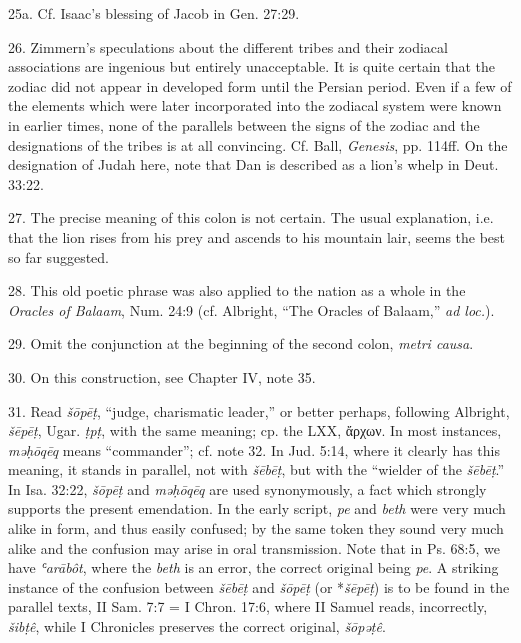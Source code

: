 \begin{enumerate}


25a. Cf. Isaac's blessing of Jacob in Gen. 27:29.

26. Zimmern's speculations about the different tribes and their zodiacal
associations are ingenious but entirely unacceptable. It is quite certain that
the zodiac did not appear in developed form until the Persian period. Even if
a few of the elements which were later incorporated into the zodiacal system
were known in earlier times, none of the parallels between the signs of the
zodiac and the designations of the tribes is at all convincing. Cf. Ball,
\emph{Genesis}, pp. 114ff. On the designation of Judah here, note that Dan is
described as a lion's whelp in Deut. 33:22.

27. The precise meaning of this colon is not certain. The usual explanation,
i.e. that the lion rises from his prey and ascends to his mountain lair, seems
the best so far suggested.

28. This old poetic phrase was also applied to the nation as a whole in the
\emph{Oracles of Balaam}, Num. 24:9 (cf. Albright, ``The Oracles of Balaam,''
\emph{ad loc.}).

29. Omit the conjunction at the beginning of the second colon, \emph{metri
causa}.

30. On this construction, see Chapter IV, note 35.

31. Read \emph{šōpēṭ}, ``judge, charismatic leader,'' or better perhaps,
following Albright, \emph{šēpēṭ}, Ugar. \emph{ṭpṭ}, with the same meaning; cp.
the LXX, ἄρχων. In most instances, \emph{məḥōqēq} means ``commander''; cf.
note 32. In Jud. 5:14, where it clearly has this meaning, it stands in parallel,
not with \emph{šēbēṭ}, but with the ``wielder of the \emph{šēbēṭ}.'' In
Isa. 32:22, \emph{šōpēṭ} and \emph{məḥōqēq} are used synonymously, a fact which
strongly supports the present emendation. In the early script, \emph{pe} and
\emph{beth} were very much alike in form, and thus easily confused; by the same
token they sound very much alike and the confusion may arise in oral
transmission. Note that in Ps. 68:5, we have \emph{ʿarābôt}, where the
\emph{beth} is an error, the correct original being \emph{pe}. A striking
instance of the confusion between \emph{šēbēṭ} and \emph{šōpēṭ} (or
*\emph{šēpēṭ}) is to be found in the parallel texts, II Sam. 7:7 =
I Chron. 17:6, where II Samuel reads, incorrectly, \emph{šibṭê}, while
I Chronicles preserves the correct original, \emph{šōpəṭê}.


\end{enumerate}
